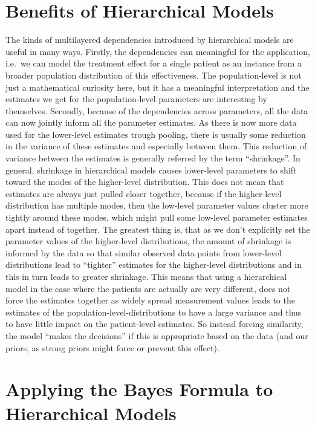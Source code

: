\documentclass[12pt,a4paper,leqno]{report}
\theoremstyle{plain}
\theoremstyle{definition}
\theoremstyle{remark}
\begin{document}

\section{Benefits of Hierarchical Models}

The kinds of multilayered dependencies introduced by hierarchical models are useful in many ways.
Firstly, the dependencies can meaningful for the application, i.e.\ we can
model the treatment effect for a single patient as an instance from a
broader population distribution of this effectiveness. The population-level is not just
a mathematical curiosity here, but it has a meaningful interpretation and the estimates we
get for the population-level parameters are interesting by themselves. Secondly, because
of the dependencies across parameters, all the data can now jointly inform all the
parameter estimates. As there is now more data used for the lower-level estimates trough
pooling, there is usually some reduction in the variance of these estimates
and especially between them. This reduction of variance between the estimates is
generally referred by the term ``shrinkage''. In general,
shrinkage in hierarchical models causes lower-level parameters to shift toward the modes
of the higher-level distribution. This does not mean that
estimates are always just pulled closer together, because if the higher-level
distribution has multiple modes, then the low-level parameter values cluster
more tightly around these modes, which might pull some
low-level parameter estimates apart instead of together. The greatest thing
is, that as we don't explicitly set the parameter values of the higher-level
distributions, the amount of shrinkage is informed by the data so that
similar observed data points from lower-level distributions lead to ``tighter''
estimates for the higher-level distributions and in this in turn leads to
greater shrinkage. This means that using a hierarchical model in the case where the
patients are actually are very different, does not force the estimates together as
widely spread measurement values leads to the estimates of the population-level-distributions to
have a large variance and thus to have little impact on the patient-level estimates. So
instead forcing similarity, the model ``makes the decisions'' if this is appropriate
based on the data (and our priors, as strong priors might force or prevent this effect).

\section{Applying the Bayes Formula to Hierarchical Models}
\end{document}
